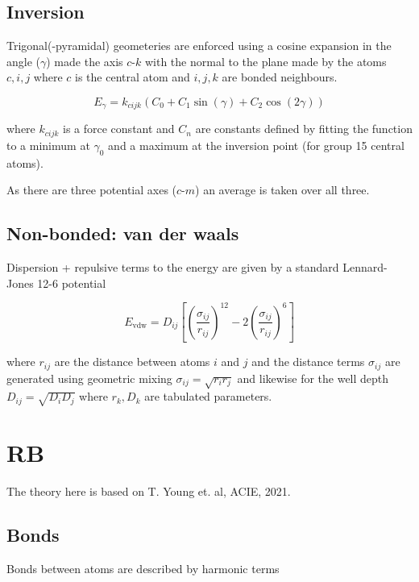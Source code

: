 \documentclass[10pt]{article}
\begin{document}
\subsection{Inversion}

Trigonal(-pyramidal) geometeries are enforced using a cosine expansion in the
angle ($\gamma$) made the axis $c\text{-}k$ with the normal to the plane made by the
atoms $c, i, j$ where $c$ is the central atom and $i,j,k$ are bonded neighbours.

\begin{equation}
    E_\gamma = k_{cijk} (C_0 + C_1 \sin(\gamma) + C_2 \cos(2\gamma))
\end{equation}

where $k_{cijk}$ is a force constant and $C_n$ are constants defined by fitting
the function to a minimum at $\gamma_0$ and a maximum at the inversion point (for
group 15 central atoms).

As there are three potential axes ($c\text{-}m$) an average is taken over all three.

    
\subsection{Non-bonded: van der waals}

Dispersion + repulsive terms to the energy are given by a standard Lennard-Jones
12-6 potential

\begin{equation}
    E_\text{vdw} = D_{ij} \left[\left( \frac{\sigma_{ij}}{r_{ij}} \right)^{12}
                                -2 \left( \frac{\sigma_{ij}}{r_{ij}} \right)^6
                            \right]
\end{equation}

where $r_{ij}$ are the distance between atoms $i$ and $j$ and the distance
terms $\sigma_{ij}$ are generated using geometric mixing
$\sigma_{ij} = \sqrt{r_i r_j}$ and likewise for the well depth
$D_{ij} = \sqrt{D_i D_j}$ where $r_k, D_k$ are tabulated parameters.


\section{RB}
The theory here is based on T. Young et. al, ACIE, 2021.

\subsection{Bonds}
Bonds between atoms are described by harmonic terms
\end{document}
